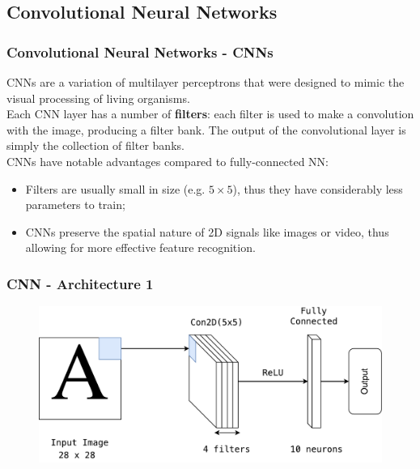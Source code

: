 \documentclass{beamer}
\begin{document}
\subsection{Convolutional Neural Networks}

\begin{frame}
	\frametitle{Convolutional Neural Networks - CNNs}
	CNNs are a variation of multilayer perceptrons that were designed to mimic the visual processing of living organisms. \\
	\vspace{1em}
	Each CNN layer has a number of \textbf{filters}: each filter is used to make a convolution with the image, producing a filter bank. The output of the convolutional layer is simply the collection of filter banks. \\
	\vspace{1em}
	CNNs have notable advantages compared to fully-connected NN:
	\begin{itemize}
		\item Filters are usually small in size (e.g. $5\times5$), thus they have considerably less parameters to train;
		\item CNNs preserve the spatial nature of 2D signals like images or video, thus allowing for more effective feature recognition.
	\end{itemize} 
\end{frame}


\begin{frame}
\frametitle{CNN - Architecture 1}
	\begin{figure}[hbt]
	\vspace{2em}
  	\includegraphics[width=1\textwidth,height=0.7\textheight,keepaspectratio]{diag_1}\\
    \vspace{2em}
	\end{figure}
\end{frame}
\end{document}

